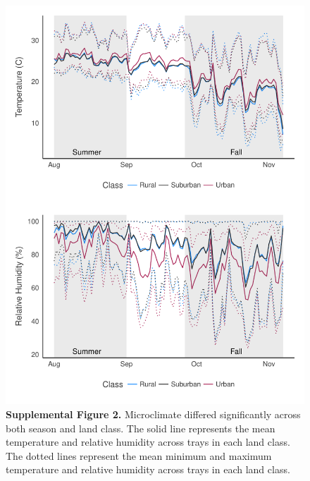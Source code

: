 \documentclass[12pt]{article}
\begin{document}
\begin{figure}
\centering
\includegraphics[width=6in]{SuppFig2.pdf}
\caption{\textbf{Supplemental Figure 2.} Microclimate differed significantly across both season and land class. The solid line represents the mean temperature and relative humidity across trays in each land class. The dotted lines represent the mean minimum and maximum temperature and relative humidity across trays in each land class.}
\end{figure}
\end{document}
